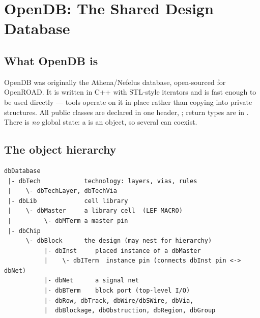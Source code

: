 \chapter{OpenDB: The Shared Design Database}
\label{ch:odb}


\section{What OpenDB is}

OpenDB was originally the Athena/Nefelus database, open-sourced for OpenROAD. It
is written in C++ with STL-style iterators and is fast enough to be used
directly --- tools operate on it in place rather than copying into private
structures. All public classes are declared in one header,
; return types are in . There
is \emph{no} global state: a  is an object, so several can coexist.

\section{The object hierarchy}

\begin{lstlisting}[style=ortcl]
dbDatabase
 |- dbTech            technology: layers, vias, rules
 |    \- dbTechLayer, dbTechVia
 |- dbLib             cell library
 |    \- dbMaster     a library cell  (LEF MACRO)
 |         \- dbMTerm a master pin
 |- dbChip
      \- dbBlock      the design (may nest for hierarchy)
           |- dbInst     placed instance of a dbMaster
           |    \- dbITerm  instance pin (connects dbInst pin <-> dbNet)
           |- dbNet      a signal net
           |- dbBTerm    block port (top-level I/O)
           |- dbRow, dbTrack, dbWire/dbSWire, dbVia,
           |  dbBlockage, dbObstruction, dbRegion, dbGroup
\end{lstlisting}


